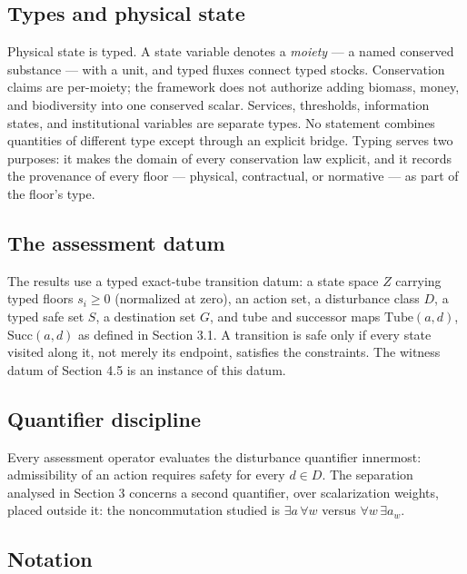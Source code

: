\documentclass[3p,11pt]{elsarticle}
\begin{document}
\subsection{Types and physical
state}\label{types-and-physical-state}

Physical state is typed. A state variable denotes a \emph{moiety} --- a
named conserved substance --- with a unit, and typed fluxes connect
typed stocks. Conservation claims are per-moiety; the framework does not
authorize adding biomass, money, and biodiversity into one conserved
scalar. Services, thresholds, information states, and institutional
variables are separate types. No statement combines quantities of different type except through an explicit bridge. Typing serves two purposes: it makes the domain of every
conservation law explicit, and it records the provenance of every floor
--- physical, contractual, or normative --- as part of the floor's type.

\subsection{The assessment datum}\label{the-assessment-datum}

The results use a typed exact-tube transition datum: a state space \(Z\) carrying typed floors \(s_i \ge 0\) (normalized at zero), an action set, a disturbance class \(D\), a typed safe set \(S\), a destination set \(G\), and tube and successor maps \(\mathrm{Tube}(a,d)\), \(\mathrm{Succ}(a,d)\) as defined in Section 3.1. A transition is safe only if every state visited along it, not merely its endpoint, satisfies the constraints. The witness datum of Section 4.5 is an instance of this datum.

\subsection{Quantifier discipline}\label{quantifier-discipline}

Every assessment operator evaluates the disturbance quantifier innermost: admissibility of an action requires safety for every \(d \in D\). The separation analysed in Section 3 concerns a second quantifier, over scalarization weights, placed outside it: the noncommutation studied is \(\exists a\, \forall w\) versus \(\forall w\, \exists a_w\).

\subsection{Notation}\label{notation}
\end{document}
